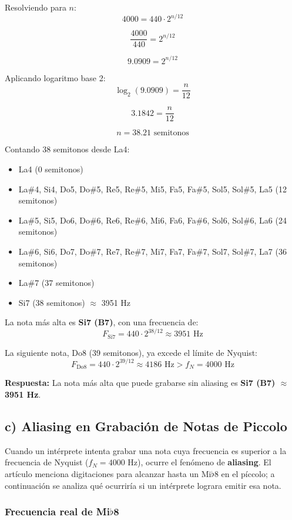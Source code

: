 \documentclass[12pt]{article}
\begin{document}
Resolviendo para \(n\):
\[
4000 = 440 \cdot 2^{n/12}
\]
 
\[
\frac{4000}{440} = 2^{n/12}
\]
 
\[
9.0909 = 2^{n/12}
\]
 
Aplicando logaritmo base 2:
\[
\log_2(9.0909) = \frac{n}{12}
\]
 
\[
3.1842 = \frac{n}{12}
\]
 
\[
n = 38.21 \text{ semitonos}
\]
 
Contando 38 semitonos desde La4:
\begin{itemize}
    \item La4 (0 semitonos)
    \item La\#4, Si4, Do5, Do\#5, Re5, Re\#5, Mi5, Fa5, Fa\#5, Sol5, Sol\#5, La5 (12 semitonos)
    \item La\#5, Si5, Do6, Do\#6, Re6, Re\#6, Mi6, Fa6, Fa\#6, Sol6, Sol\#6, La6 (24 semitonos)
    \item La\#6, Si6, Do7, Do\#7, Re7, Re\#7, Mi7, Fa7, Fa\#7, Sol7, Sol\#7, La7 (36 semitonos)
    \item La\#7 (37 semitonos)
    \item Si7 (38 semitonos) $\approx$ 3951 Hz
\end{itemize}

La nota más alta es \textbf{Si7 (B7)}, con una frecuencia de:
\[
F_{\text{Si7}} = 440 \cdot 2^{38/12} \approx 3951 \text{ Hz}
\]

La siguiente nota, Do8 (39 semitonos), ya excede el límite de Nyquist:
\[
F_{\text{Do8}} = 440 \cdot 2^{39/12} \approx 4186 \text{ Hz} > f_N = 4000 \text{ Hz}
\]

\textbf{Respuesta:} La nota más alta que puede grabarse sin aliasing es \textbf{Si7 (B7) $\approx$ 3951 Hz}.
 
\subsection*{c) Aliasing en Grabación de Notas de Piccolo}

Cuando un intérprete intenta grabar una nota cuya frecuencia es superior a la frecuencia de Nyquist (\(f_N = 4000 \text{ Hz}\)), ocurre el fenómeno de \textbf{aliasing}. El artículo menciona digitaciones para alcanzar hasta un Mi\(\flat\)8 en el píccolo; a continuación se analiza qué ocurriría si un intérprete lograra emitir esa nota.

\subsubsection*{Frecuencia real de Mi\(\flat\)8}
\end{document}
